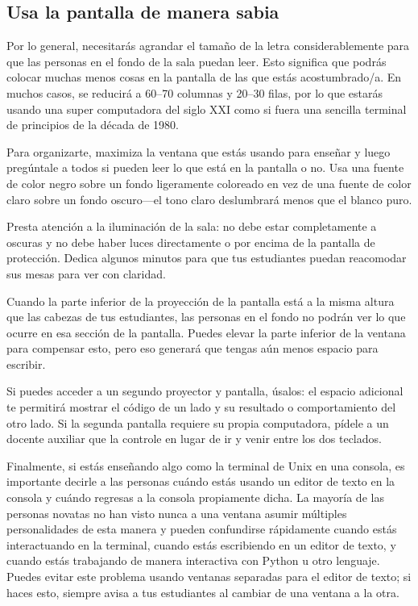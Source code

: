 \subsection*{Usa la pantalla de manera sabia}

Por lo general, necesitarás agrandar el tamaño de la letra considerablemente
para que las personas en el fondo de la sala puedan leer.
Esto significa que podrás colocar muchas menos cosas en la pantalla de las que estás acostumbrado/a.
En muchos casos, se reducirá a 60--70 columnas y 20--30 filas,
por lo que estarás usando una super computadora del siglo XXI
como si fuera una sencilla terminal de principios de la década de 1980.

Para organizarte,
maximiza la ventana que estás usando para enseñar
y luego pregúntale a todos si pueden leer lo que está en la pantalla o no.
Usa una fuente de color negro sobre un fondo ligeramente coloreado en vez de una fuente de color claro sobre un fondo oscuro---el tono claro deslumbrará
menos que el blanco puro.

Presta atención a la iluminación de la sala:
no debe estar completamente a oscuras y no debe haber luces directamente
o por encima de la pantalla de protección.
Dedica algunos minutos para que tus estudiantes puedan reacomodar sus mesas
para ver con claridad.

Cuando la parte inferior de la proyección de la pantalla está a la misma altura que las cabezas de tus estudiantes,
las personas en el fondo no podrán ver lo que ocurre en esa sección de la pantalla.
Puedes elevar la parte inferior de la ventana para compensar esto,
pero eso generará que tengas aún menos espacio para escribir.

Si puedes acceder a un segundo proyector y pantalla,
úsalos:
el espacio adicional te permitirá mostrar el código de un lado
y su resultado o comportamiento del otro lado.
Si la segunda pantalla requiere su propia computadora,
pídele a un docente auxiliar que la controle
en lugar de ir y venir entre los dos teclados.

Finalmente,
si estás enseñando algo como la terminal de Unix en una consola,
es importante decirle a las personas cuándo estás usando un editor de texto en la consola
y cuándo regresas a la consola propiamente dicha.
La mayoría de las personas novatas no han visto nunca a una ventana asumir múltiples personalidades de esta manera
y pueden confundirse rápidamente
cuando estás interactuando en la terminal,
cuando estás escribiendo en un editor de texto,
y cuando estás trabajando de manera interactiva con Python u otro lenguaje.
Puedes evitar este problema usando ventanas separadas para el editor de texto;
si haces esto,
siempre avisa a tus estudiantes al cambiar de una ventana a la otra.

